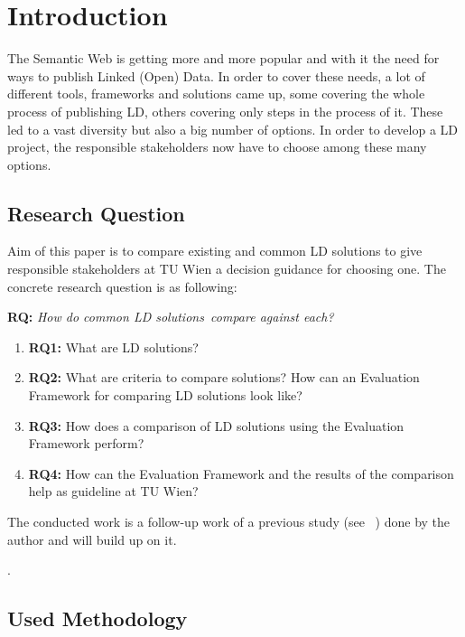 \chapter{Introduction}

The Semantic Web is getting more and more popular and with it the need for ways to publish Linked (Open) Data. In order to cover these needs, a lot of different tools, frameworks and solutions came up, some covering the whole process of publishing LD, others covering only steps in the process of it. These led to a vast diversity but also a big number of options. In order to develop a LD project, the responsible stakeholders now have to choose among these many options.

\section{Research Question}

Aim of this paper is to compare existing and common LD solutions to give responsible stakeholders at TU Wien a decision guidance for choosing one. The concrete research question is as following:

\textbf{RQ:} \textit{How do common LD solutions~\footnotemark compare against each?}
\begin{enumerate}
\item \textbf{RQ1:} What are LD solutions? 
\item \textbf{RQ2:} What are criteria to compare solutions? How can an Evaluation Framework for comparing LD solutions look like?
\item \textbf{RQ3:} How does a comparison of LD solutions using the Evaluation Framework perform?
\item \textbf{RQ4:} How can the Evaluation Framework and the results of the comparison help as guideline at TU Wien?
\end{enumerate}

The conducted work is a follow-up work of a previous study (see ~\cite{baronyai_publishing_2016}) done by the author and will build up on it.

.

\section{Used Methodology}


